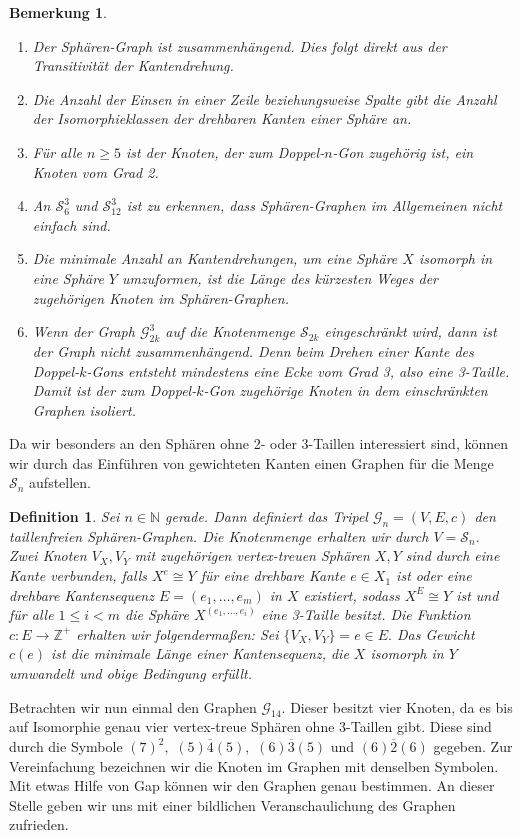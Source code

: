 \documentclass[12pt,titlepage,twoside,cleardoublepage]{article}
\theoremstyle{nummermitklammern}
\newtheorem{definition}[temp]{Definition}
\newtheorem{bemerkung}[temp]{Bemerkung}
\newtheorem{definition}[zahl]{Definition}
\newtheorem{bemerkung}[zahl]{Bemerkung}
\numberwithin{equation}{section}
\begin{document}
 \begin{bemerkung}
 \begin{enumerate}
 \item Der Sphären-Graph ist zusammenhängend. Dies folgt direkt aus der Transitivität der Kantendrehung.
 \item Die Anzahl der Einsen in einer Zeile beziehungsweise Spalte gibt die Anzahl der Isomorphieklassen der drehbaren Kanten einer Sphäre an.
 \item Für alle $n\geq 5$ ist der Knoten, der zum Doppel-$n$-Gon zugehörig ist, ein Knoten vom Grad 2.
 \item An $\mathcal{S}^3_6$ und $\mathcal{S}_{12}^3$ ist zu erkennen, dass Sphären-Graphen im Allgemeinen nicht einfach sind. 
 \item Die minimale Anzahl an Kantendrehungen, um eine Sphäre $X$ isomorph in eine Sphäre $Y$ umzuformen, ist die Länge des kürzesten Weges der zugehörigen Knoten im Sphären-Graphen.   
 \item Wenn der Graph $\mathcal{G}^3_{2k}$ auf die Knotenmenge $\mathcal{S}_{2k}$ eingeschränkt wird, dann ist der Graph nicht zusammenhängend. Denn beim Drehen einer Kante des Doppel-$k$-Gons entsteht mindestens eine Ecke vom Grad 3, also eine 3-Taille. Damit ist der zum Doppel-$k$-Gon zugehörige Knoten in dem einschränkten Graphen isoliert.
 \end{enumerate}
 \end{bemerkung}
 Da wir besonders an den Sphären ohne 2- oder 3-Taillen interessiert sind, können wir durch das Einführen von gewichteten Kanten einen Graphen für die Menge $\mathcal{S}_n$ aufstellen.
 \begin{definition}
Sei $n\in \mathbb{N}$ gerade. Dann definiert das Tripel $\mathcal{G}_n=(V,E,c)$ den \emph{taillenfreien Sphären-Graphen}. Die Knotenmenge erhalten wir durch $V=\mathcal{S}_n.$ Zwei Knoten $V_X,V_Y$ mit zugehörigen vertex-treuen Sphären $X,Y$ sind durch eine Kante verbunden, falls $X^e\cong Y$ für eine drehbare Kante $e\in X_1$ ist oder eine drehbare Kantensequenz $E=(e_1,\ldots,e_m)$ in $X$ existiert, sodass $X^E\cong Y$ ist und für alle $1\leq i < m $ die Sphäre $X^{(e_1,\ldots,e_i)}$ eine 3-Taille besitzt. Die Funktion $c:E\to\mathbb{Z}^+$  erhalten wir folgendermaßen: Sei $\{V_X,V_Y\}=e\in E.$ Das Gewicht $c(e)$ ist die minimale Länge einer Kantensequenz, die $X$ isomorph in $Y$ umwandelt und obige Bedingung erfüllt.
 \end{definition}
 Betrachten wir nun einmal den Graphen $\mathcal{G}_{14}.$
Dieser besitzt vier Knoten, da es bis auf Isomorphie genau vier vertex-treue Sphären ohne 3-Taillen gibt. Diese sind durch die Symbole $(7)^2,$ $(5)\overline{4}(5),$ $(6)\overline{3}(5)$ und $(6)\overline{2}(6)$ gegeben. Zur Vereinfachung bezeichnen wir die Knoten im Graphen mit denselben Symbolen. Mit etwas Hilfe von Gap können wir den Graphen genau bestimmen. An dieser Stelle geben wir uns mit einer bildlichen Veranschaulichung des Graphen zufrieden.
\end{document}
